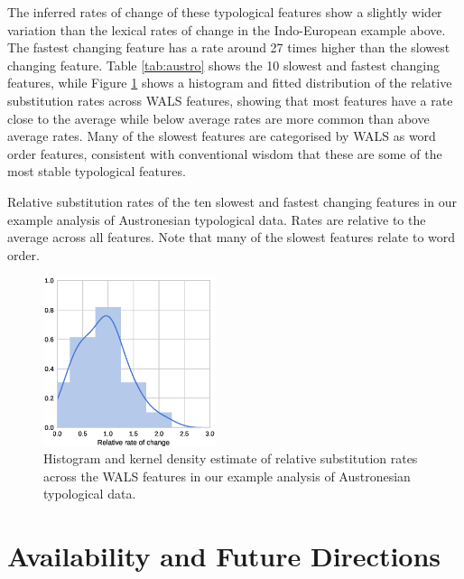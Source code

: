 \documentclass[10pt,a4paper]{article}
\begin{document}
The inferred rates of change of these typological features show a slightly wider variation than the lexical rates of change in the Indo-European example above.  The fastest changing feature has a rate around 27 times higher than the slowest changing feature.  Table \ref{tab:austro} shows the 10 slowest and fastest changing features, while Figure \ref{fig:austro} shows a histogram and fitted distribution of the relative substitution rates across WALS features, showing that most features have a rate close to the average while below average rates are more common than above average rates.  Many of the slowest features are categorised by WALS as word order features, consistent with conventional wisdom that these are some of the most stable typological features.  

\begin{table}[ht]
	\begin{center}
		
	\end{center}
	\caption{Relative substitution rates of the ten slowest and fastest changing features in our example analysis of Austronesian typological data.  Rates are relative to the average across all features.  Note that many of the slowest features relate to word order.}
\label{tab:austro}
\end{table}

\begin{figure}[t]
	\begin{center}
	\includegraphics[width=0.45\textwidth]{examples/austronesian/rate_variation.eps}
	\end{center}
\caption{Histogram and kernel density estimate of relative substitution rates across the WALS features in our example analysis of Austronesian typological data.}
\label{fig:austro}
\end{figure}

\section{Availability and Future Directions}
\end{document}
